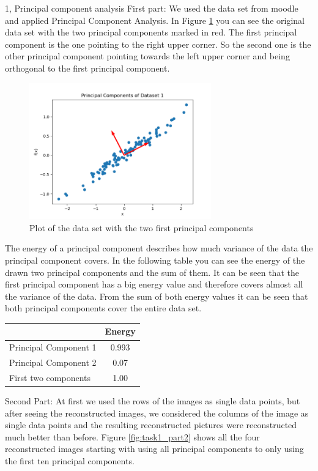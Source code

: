 \documentclass[10pt,a4paper]{article}
\begin{document}
\frontpage

\begin{task}{1, Principal component analysis}
First part: We used the data set from moodle and applied Principal Component Analysis. In Figure \ref{fig:task1_part1} you can see the original data set with the two principal components marked in red. The first principal component is the one pointing to the right upper corner. So the second one is the other principal component pointing towards the left upper corner and being orthogonal to the first principal component.
\begin{figure}[H]
\centering
\includegraphics[width=0.7\textwidth]{../plots/task1/PCA_1.png}
\caption{Plot of the data set with the two first principal components}
\label{fig:task1_part1}
\end{figure}
The energy of a principal component describes how much variance of the data the principal component covers. In the following table you can see the energy of the drawn two principal components and the sum of them. It can be seen that the first principal component has a big energy value and therefore covers almost all the variance of the data. From the sum of both energy values it can be seen that both principal components cover the entire data set.
\begin{center}
\begin{tabular}{l|c}
&Energy \\
\hline
Principal Component 1& 0.993\\
Principal Component 2& 0.07\\
First two components & 1.00\\
\hline
\end{tabular}
\end{center}
\bigbreak
Second Part: 
At first we used the rows of the images as single data points, but after seeing the reconstructed images, we considered the columns of the image as single data points and the resulting reconstructed pictures were reconstructed much better than before. Figure \ref{fig:task1_part2} shows all the four reconstructed images starting with using all principal components to only using the first ten principal components.

\end{task}
\end{document}
